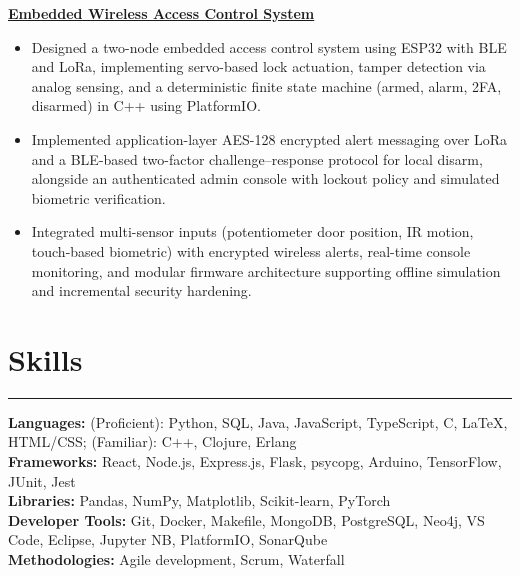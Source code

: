 \documentclass[10pt]{article}
\begin{document}
\href{https://github.com/Extinctable/SOEN-422-Project}{\textbf{Embedded Wireless Access Control System}}
\vspace{-4mm}
\begin{itemize}[left=0.15in, itemsep=1pt, label=--]
    \item Designed a two-node embedded access control system using ESP32 with BLE and LoRa, implementing servo-based lock actuation, tamper detection via analog sensing, and a deterministic finite state machine (armed, alarm, 2FA, disarmed) in C++ using PlatformIO.
    \item Implemented application-layer AES-128 encrypted alert messaging over LoRa and a BLE-based two-factor challenge--response protocol for local disarm, alongside an authenticated admin console with lockout policy and simulated biometric verification.
    \item Integrated multi-sensor inputs (potentiometer door position, IR motion, touch-based biometric) with encrypted wireless alerts, real-time console monitoring, and modular firmware architecture supporting offline simulation and incremental security hardening.
\end{itemize}

\vspace{-6mm} %
\section*{Skills}
\vspace{-2mm}
\hrule
\vspace{0mm}
\textbf{Languages:} (Proficient): Python, SQL, Java, JavaScript, TypeScript, C, LaTeX, HTML/CSS; (Familiar): C++, Clojure, Erlang \\
\textbf{Frameworks:} React, Node.js, Express.js, Flask, psycopg, Arduino, TensorFlow, JUnit, Jest \\
\textbf{Libraries:} Pandas, NumPy, Matplotlib, Scikit-learn, PyTorch \\
\textbf{Developer Tools:} Git, Docker, Makefile, MongoDB, PostgreSQL, Neo4j, VS Code, Eclipse, Jupyter NB, PlatformIO, SonarQube \\
\textbf{Methodologies:} Agile development, Scrum, Waterfall
\end{document}
